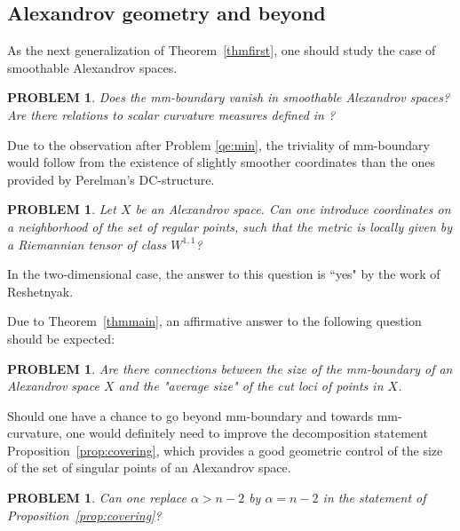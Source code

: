 \documentclass[12pt,leqno]{amsart}
\numberwithin{equation}{section}
\newtheorem{quest}[thm]{PROBLEM}
\theoremstyle{definition}
\theoremstyle{remark}
\newcommand{\tref}[1]{Theorem~\ref{#1}}
\newcommand{\pref}[1]{Proposition~\ref{#1}}
\begin{document}
\subsection{Alexandrov geometry and beyond}
As the next  generalization of \tref{thmfirst}, one should study  the case of smoothable Alexandrov spaces.

\begin{quest}
Does the mm-boundary vanish  in smoothable Alexandrov spaces?   Are there relations to scalar curvature measures defined in \cite{LP}?
\end{quest}


 Due to the observation after Problem \ref{qe:min}, the triviality of mm-boundary would follow from the existence of slightly smoother coordinates than the ones provided by Perelman's DC-structure.
\begin{quest}
Let $X$ be an Alexandrov space. Can one introduce coordinates on a neighborhood of the set of regular points, such that the metric is locally given by a Riemannian tensor of class $W^{1,1}$?
\end{quest}
In the two-dimensional case, the answer to this question is ``yes" by the work of Reshetnyak.


Due to  \tref{thmmain}, an affirmative answer to the following question should be expected:
\begin{quest}
Are there connections between the size of the mm-boundary of an Alexandrov space $X$ and the "average size" of the cut loci of  points in $X$.
\end{quest}



Should one have a chance to go beyond mm-boundary and towards mm-curvature, one would definitely need to improve the
decomposition statement \pref{prop:covering}, which provides a good geometric control of the size of the set of singular points of an Alexandrov space.
\begin{quest} \label{qe:control}
Can one replace $\alpha>n-2$ by $\alpha=n-2$ in the statement of \pref{prop:covering}?
\end{quest}
\end{document}
